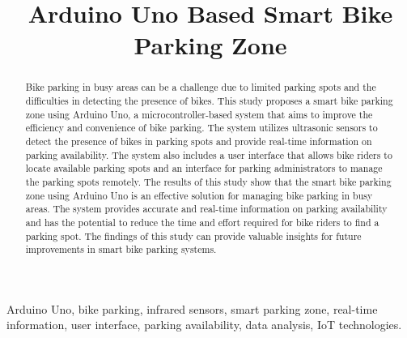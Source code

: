 \documentclass[conference]{IEEEtran}
\begin{document}
	
	\title{Arduino Uno Based Smart Bike Parking Zone\\
		

	}
	
	\author{ 
		\and
	}
	
	\maketitle
	
	\begin{abstract}
		Bike parking in busy areas can be a challenge due to limited parking spots and the difficulties in detecting the presence of bikes. This study proposes a smart bike parking zone using Arduino Uno, a microcontroller-based system that aims to improve the efficiency and convenience of bike parking. The system utilizes ultrasonic sensors to detect the presence of bikes in parking spots and provide real-time information on parking availability. The system also includes a user interface that allows bike riders to locate available parking spots and an interface for parking administrators to manage the parking spots remotely. The results of this study show that the smart bike parking zone using Arduino Uno is an effective solution for managing bike parking in busy areas. The system provides accurate and real-time information on parking availability and has the potential to reduce the time and effort required for bike riders to find a parking spot. The findings of this study can provide valuable insights for future improvements in smart bike parking systems.
	\end{abstract}
	
	\begin{IEEEkeywords}
		Arduino Uno, bike parking, infrared sensors, smart parking zone, real-time information, user interface, parking availability, data analysis, IoT technologies.
	\end{IEEEkeywords}
	
\end{document}
